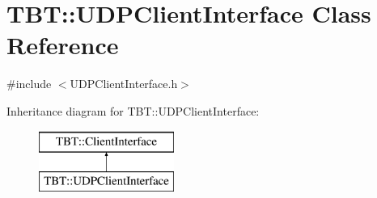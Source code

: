 \hypertarget{classTBT_1_1UDPClientInterface}{}\section{T\+BT\+:\+:U\+D\+P\+Client\+Interface Class Reference}
\label{classTBT_1_1UDPClientInterface}


{\ttfamily \#include $<$U\+D\+P\+Client\+Interface.\+h$>$}

Inheritance diagram for T\+BT\+:\+:U\+D\+P\+Client\+Interface\+:\begin{figure}[H]
\begin{center}
\leavevmode
\includegraphics[height=2.000000cm]{classTBT_1_1UDPClientInterface}
\end{center}
\end{figure}
